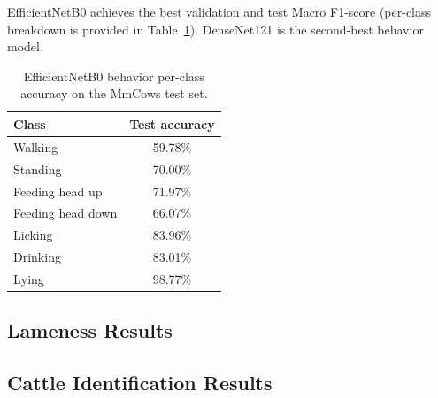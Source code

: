 EfficientNetB0 achieves the best validation and test Macro F1-score (per-class breakdown is provided in Table~\ref{tab:behavior_per_class}). DenseNet121 is the second-best behavior model.

\begin{table}[H]
\centering
\caption{EfficientNetB0 behavior per-class accuracy on the MmCows test set.}
\label{tab:behavior_per_class}
\begin{tabular}{lc}
\toprule
\textbf{Class} & \textbf{Test accuracy} \\
\midrule
Walking & 59.78\% \\
Standing & 70.00\% \\
Feeding head up & 71.97\% \\
Feeding head down & 66.07\% \\
Licking & 83.96\% \\
Drinking & 83.01\% \\
Lying & 98.77\% \\
\bottomrule
\end{tabular}
\end{table}

\subsection{Lameness Results}
\begin{table}[H]
\centering
\caption{Lameness detection results.}
\label{tab:lameness_baselines}
\end{table}

\subsection{Cattle Identification Results}
\begin{table}[H]
\centering
\caption{OpenCows2020 ID result.}
\label{tab:id_baselines}
\end{table}

